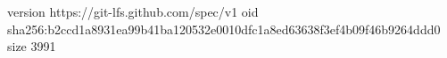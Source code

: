version https://git-lfs.github.com/spec/v1
oid sha256:b2ccd1a8931ea99b41ba120532e0010dfc1a8ed63638f3ef4b09f46b9264ddd0
size 3991
